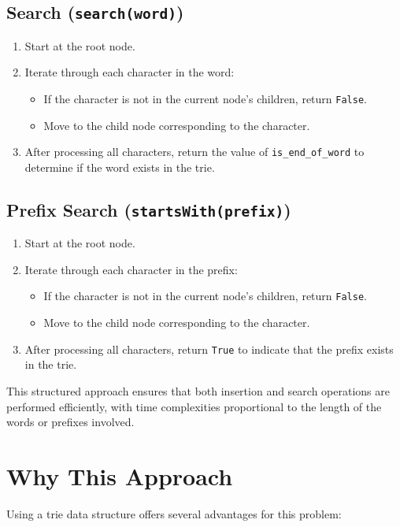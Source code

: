 \subsection*{Search (\texttt{search(word)})}
\begin{enumerate}
    \item Start at the root node.
    \item Iterate through each character in the word:
    \begin{itemize}
        \item If the character is not in the current node's children, return \texttt{False}.
        \item Move to the child node corresponding to the character.
    \end{itemize}
    \item After processing all characters, return the value of \texttt{is\_end\_of\_word} to determine if the word exists in the trie.
\end{enumerate}

\subsection*{Prefix Search (\texttt{startsWith(prefix)})}
\begin{enumerate}
    \item Start at the root node.
    \item Iterate through each character in the prefix:
    \begin{itemize}
        \item If the character is not in the current node's children, return \texttt{False}.
        \item Move to the child node corresponding to the character.
    \end{itemize}
    \item After processing all characters, return \texttt{True} to indicate that the prefix exists in the trie.
\end{enumerate}

This structured approach ensures that both insertion and search operations are performed efficiently, with time complexities proportional to the length of the words or prefixes involved.

\section*{Why This Approach}

Using a trie data structure offers several advantages for this problem:

